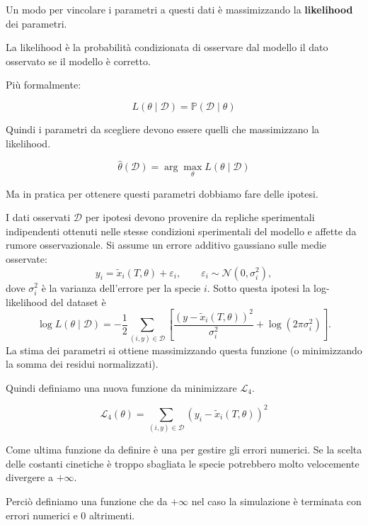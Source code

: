 Un modo per vincolare i parametri a questi dati è massimizzando la \textbf{likelihood} \cite{Simpson2025} dei parametri.

La likelihood è la probabilità condizionata di osservare dal modello
il dato osservato se il modello è corretto.

Più formalmente:

\begin{equation}
    L(\theta \mid \mathcal{D}) = \mathbb{P}(\mathcal{D} \mid \theta)
\end{equation}

Quindi i parametri da scegliere devono essere quelli che massimizzano la likelihood.

\begin{equation}
    \hat{\theta}(\mathcal{D}) = \arg\max_{\theta} L(\theta \mid \mathcal{D})
\end{equation}

Ma in pratica per ottenere questi parametri dobbiamo fare delle ipotesi.

I dati osservati $\mathcal{D}$ per ipotesi devono provenire da repliche sperimentali indipendenti ottenuti nelle stesse condizioni sperimentali del modello e affette da rumore osservazionale.
Si assume un errore additivo gaussiano sulle medie osservate:
\[
y_i = \tilde{x}_i(T,\theta) + \varepsilon_i,\qquad \varepsilon_i \sim \mathcal{N}(0,\sigma_i^2),
\]
dove \(\sigma_i^2\) è la varianza dell'errore per la specie \(i\). Sotto questa ipotesi la log-likelihood del dataset è
\[
\log L(\theta\mid\mathcal{D}) = -\frac{1}{2}\sum_{ (i,y) \in\mathcal{D}}\left[\frac{(y-\tilde{x}_i(T,\theta))^2}{\sigma_i^2} + \log(2\pi\sigma_i^2)\right].
\]
La stima dei parametri si ottiene massimizzando questa funzione (o minimizzando la somma dei residui normalizzati).

Quindi definiamo una nuova funzione da minimizzare $\mathcal{L}_4$.

\begin{equation}
    \mathcal{L}_4(\theta) = \sum_{(i,y) \in \mathcal{D}} (y_i - \tilde{x}_i(T,\theta))^2
\end{equation}

Come ultima funzione da definire è una per gestire gli errori numerici. Se la scelta delle costanti cinetiche è troppo sbagliata le specie potrebbero molto velocemente divergere a $+\infty$.

Perciò definiamo una funzione che da $+\infty$ nel caso la simulazione è terminata con errori numerici e 0 altrimenti.


